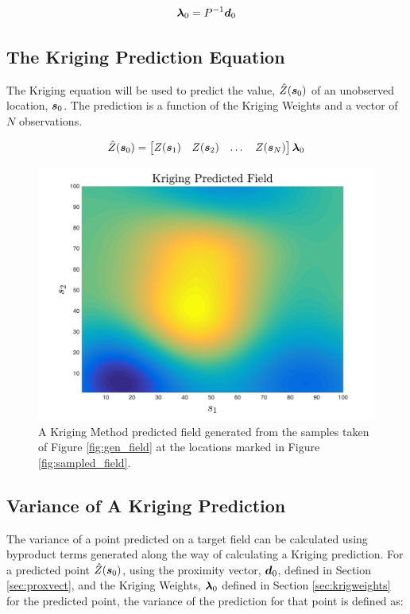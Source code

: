 \begin{equation}
    {\it{\boldsymbol{\lambda}}}_{0} = P^{-1}{\it{\boldsymbol{d}}}_{0}
    \label{eq:krigweights}
\end{equation}

\subsection{The Kriging Prediction Equation}
The Kriging equation will be used to predict the value, $\hat{Z}({\it{\boldsymbol{s}}}_0)$ of an unobserved location, ${\it{\boldsymbol{s}}}_0$. The prediction is a function of the Kriging Weights and a vector of $N$ observations. 

\begin{equation}
    \hat{Z}({\it{\boldsymbol{s}}}_0) = \begin{bmatrix} Z({\it{\boldsymbol{s}}}_1) & Z({\it{\boldsymbol{s}}}_2) & \dots & Z({\it{\boldsymbol{s}}}_N) \end{bmatrix}{\it{\boldsymbol{\lambda}}}_{0}
    \label{eq:krigeq}
\end{equation}

\begin{figure}[!]
    \centering
    \includegraphics[width=0.8\linewidth]{figures/kriging_prediction.png}
    \caption{A Kriging Method predicted field generated from the samples taken of Figure \ref{fig:gen_field} at the locations marked in Figure \ref{fig:sampled_field}.}
    \label{fig:krig_field}
\end{figure}

\subsection{Variance of A Kriging Prediction}
The variance of a point predicted on a target field can be calculated using byproduct terms generated along the way of calculating a Kriging prediction. For a predicted point $\hat{Z}({\it{\boldsymbol{s}}}_0)$, using the proximity vector, ${\it{\boldsymbol{d}}}_0$, defined in Section \ref{sec:proxvect}, and the Kriging Weights, ${\it{\boldsymbol{\lambda}}}_0$ defined in Section \ref{sec:krigweights} for the predicted point, the variance of the prediction for that point is defined as:

